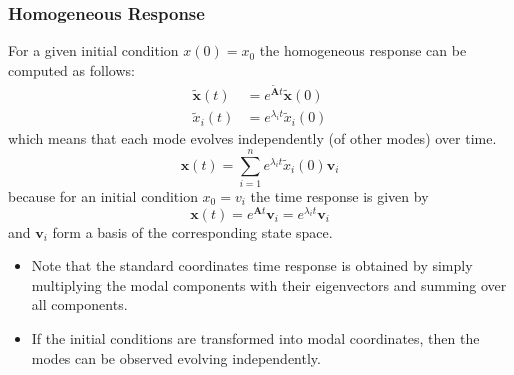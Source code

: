 \subsubsection{Homogeneous Response}
For a given initial condition $x(0)=x_0$ the homogeneous response can be computed as follows:\\
\begin{align*}
    \tilde{\mathbf{x}}(t) & =e^{\tilde{\mathbf{A}}t}\tilde{\mathbf{x}}(0) \\
    \tilde{x}_i(t)        & =e^{\lambda_{i}t}\tilde{x}_i(0)
\end{align*}
which means that each mode evolves independently (of other modes) over time.\\
\begin{equation*}
    \mathbf{x}(t)=\sum_{i=1}^{n}e^{\lambda_{i}t}\tilde{x}_i(0)\mathbf{v}_i
\end{equation*}
because for an initial condition $x_0 = v_i$ the time response is given by
\begin{equation*}
    \mathbf{x}(t)=e^{\mathbf{A}t}\mathbf{v}_i=e^{\lambda_{i}t}\mathbf{v}_i
\end{equation*}
and $\mathbf{v}_i$ form a basis of the corresponding state space.

\newpar{}
\begin{itemize}
    \item Note that the standard coordinates time response is obtained by simply multiplying the modal components with their eigenvectors and summing over all components.
    \item If the initial conditions are transformed into modal coordinates, then the modes can be observed evolving independently. %
\end{itemize}

